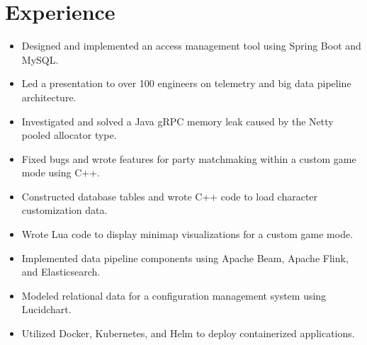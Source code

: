 \documentclass[letterpaper]{resume}
\begin{document}
\begin{minipage}[t]{0.77\columnwidth}


\section{Experience}

\vspace{2pt}
\begin{itemize}
\item Designed and implemented an access management tool using Spring Boot and MySQL.
\item Led a presentation to over 100 engineers on telemetry and big data pipeline architecture.
\item Investigated and solved a Java gRPC memory leak caused by the Netty pooled allocator type.
\end{itemize}
\vspace{3pt}
\vspace{2pt}
\begin{itemize}
\item Fixed bugs and wrote features for party matchmaking within a custom game mode using C++.
\item Constructed database tables and wrote C++ code to load character customization data.
\item Wrote Lua code to display minimap visualizations for a custom game mode.
\end{itemize}
\vspace{3pt}
\vspace{2pt}
\begin{itemize}
\item Implemented data pipeline components using Apache Beam, Apache Flink, and Elasticsearch.
\item Modeled relational data for a configuration management system using Lucidchart.
\item Utilized Docker, Kubernetes, and Helm to deploy containerized applications.
\end{itemize}


\end{minipage}
\end{document}
